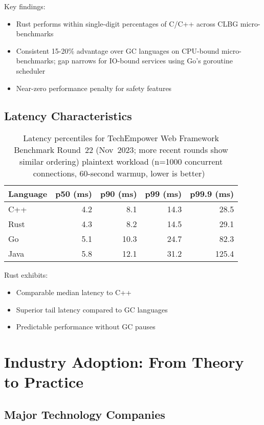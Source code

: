 \documentclass[11pt]{article}
\begin{document}
Key findings:
\begin{itemize}
    \item Rust performs within single-digit percentages of C/C++ across CLBG micro-benchmarks
    \item Consistent 15-20\% advantage over GC languages on CPU-bound micro-benchmarks; gap narrows for IO-bound services using Go's goroutine scheduler
    \item Near-zero performance penalty for safety features
\end{itemize}

\subsection{Latency Characteristics}

\begin{table}[ht]
\centering
\begin{tabular}{@{}lrrrr@{}}
\toprule
\textbf{Language} & \textbf{p50 (ms)} & \textbf{p90 (ms)} & \textbf{p99 (ms)} & \textbf{p99.9 (ms)} \\
\midrule
C++ & 4.2 & 8.1 & 14.3 & 28.5 \\
Rust & 4.3 & 8.2 & 14.5 & 29.1 \\
Go & 5.1 & 10.3 & 24.7 & 82.3 \\
Java & 5.8 & 12.1 & 31.2 & 125.4 \\
\bottomrule
\end{tabular}
\caption{Latency percentiles for TechEmpower Web Framework Benchmark Round 22 (Nov 2023; more recent rounds show similar ordering) plaintext workload (n=1000 concurrent connections, 60-second warmup, lower is better)~\cite{techempower2023}}
\label{tab:latency}
\end{table}

Rust exhibits:
\begin{itemize}
    \item Comparable median latency to C++
    \item Superior tail latency compared to GC languages
    \item Predictable performance without GC pauses
\end{itemize}

\section{Industry Adoption: From Theory to Practice}

\subsection{Major Technology Companies}
\end{document}
